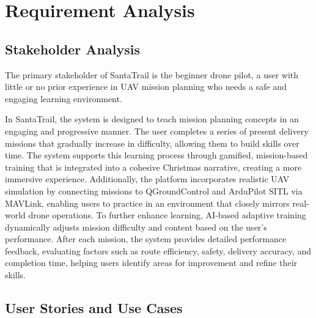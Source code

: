 \chapter{Requirement Analysis}
\label{chap:requirement-analysis}

\section{Stakeholder Analysis}
\label{section:stakeholder-analysis}

The primary stakeholder of SantaTrail is the beginner drone pilot, a user with little or no prior experience in UAV mission planning who needs a safe and engaging learning environment.

In SantaTrail, the system is designed to teach mission planning concepts in an engaging and progressive manner. The user completes a series of present delivery missions that gradually increase in difficulty, allowing them to build skills over time. The system supports this learning process through gamified, mission-based training that is integrated into a cohesive Christmas narrative, creating a more immersive experience. Additionally, the platform incorporates realistic UAV simulation by connecting missions to QGroundControl and ArduPilot SITL via MAVLink, enabling users to practice in an environment that closely mirrors real-world drone operations. To further enhance learning, AI-based adaptive training dynamically adjusts mission difficulty and content based on the user's performance. After each mission, the system provides detailed performance feedback, evaluating factors such as route efficiency, safety, delivery accuracy, and completion time, helping users identify areas for improvement and refine their skills.


\section{User Stories and Use Cases}
\label{section:user-stories-use-cases}

